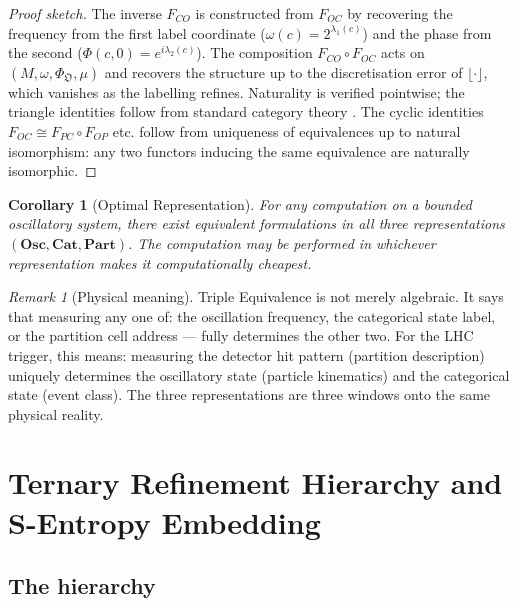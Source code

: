 \documentclass[twocolumn,10pt,a4paper]{article}
\theoremstyle{thmstyle}
\newtheorem{corollary}[theorem]{Corollary}
\theoremstyle{definition}
\theoremstyle{remark}
\newtheorem{remark}[theorem]{Remark}
\newcommand{\Osc}{\mathbf{Osc}}
\newcommand{\Cat}{\mathbf{Cat}}
\newcommand{\Part}{\mathbf{Part}}
\begin{document}
\begin{proof}[Proof sketch]
The inverse $F_{CO}$ is constructed from $F_{OC}$ by recovering the
frequency from the first label coordinate ($\omega(c) = 2^{\lambda_1(c)}$)
and the phase from the second ($\Phi(c,0) = e^{i\lambda_2(c)}$).
The composition $F_{CO} \circ F_{OC}$ acts on $(M, \omega, \Phi_\mathfrak{O}, \mu)$
and recovers the structure up to the discretisation error of $\lfloor\cdot\rfloor$,
which vanishes as the labelling refines. Naturality is verified pointwise;
the triangle identities follow from standard category theory
\citep{maclane1998}.
The cyclic identities $F_{OC} \cong F_{PC} \circ F_{OP}$ etc. follow from
uniqueness of equivalences up to natural isomorphism: any two functors
inducing the same equivalence are naturally isomorphic.
\end{proof}

\begin{corollary}[Optimal Representation]
\label{cor:optimal_rep}
For any computation on a bounded oscillatory system, there exist equivalent
formulations in all three representations $(\Osc, \Cat, \Part)$.
The computation may be performed in whichever representation makes it
computationally cheapest.
\end{corollary}

\begin{remark}[Physical meaning]
Triple Equivalence is not merely algebraic. It says that measuring
any one of: the oscillation frequency, the categorical state label, or the
partition cell address — fully determines the other two. For the LHC trigger,
this means: measuring the detector hit pattern (partition description)
uniquely determines the oscillatory state (particle kinematics) and the
categorical state (event class). The three representations are three windows
onto the same physical reality.
\end{remark}

\section{Ternary Refinement Hierarchy and S-Entropy Embedding}
\label{sec:ternary}

\subsection{The hierarchy}
\end{document}
